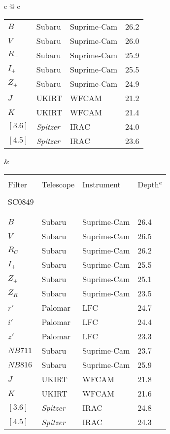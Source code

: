 \documentclass[a4paper,fleqn,usenatbib]{mnras}
\begin{document}
\begin{table*}
\begin{center}
\begin{tabular}{c @{\hskip 15mm} c}
\begin{tabular}{llll}
		$B$    &   Subaru   &   Suprime-Cam   &   26.2   \\
		$V$    &   Subaru   &   Suprime-Cam   &   26.0   \\
		$R_+$    &   Subaru   &   Suprime-Cam   &   25.9   \\
		$I_+$    &   Subaru   &   Suprime-Cam   &   25.5   \\
		$Z_+$    &   Subaru   &   Suprime-Cam   &   24.9   \\
		$J$   &   UKIRT   &   WFCAM   &   21.2   \\
		$K$   &   UKIRT   &   WFCAM   &   21.4   \\
		$[3.6]$  &   {\it Spitzer}  &   IRAC   &   24.0   \\
		$[4.5]$  &   {\it Spitzer}  &   IRAC   &   23.6   \\



		\end{tabular}

		&

		\begin{tabular}{llll}

		\hline \\[-3mm]  

		Filter & Telescope & Instrument & Depth$^a$ \\[0mm]

		\hline \\[-3mm]  
		SC0849 \\[-1mm]
		\hline \\[-5mm]  
		\hline \\[-2mm]

		$B$    &   Subaru   &   Suprime-Cam   &   26.4   \\
		$V$    &   Subaru   &   Suprime-Cam   &   26.5   \\
		$R_C$  &   Subaru   &   Suprime-Cam   &   26.2   \\
		$I_+$  &   Subaru   &   Suprime-Cam   &   25.5   \\
		$Z_+$  &   Subaru   &   Suprime-Cam   &   25.1   \\
		$Z_R$  &   Subaru   &   Suprime-Cam   &   23.5   \\
		$r'$   &   Palomar   &   LFC   &   24.7   \\
		$i'$   &   Palomar   &   LFC   &   24.4   \\
		$z'$   &   Palomar   &   LFC   &   23.3   \\
		$NB711$  &   Subaru   &   Suprime-Cam   &   23.7   \\
		$NB816$  &   Subaru   &   Suprime-Cam   &   25.9   \\
		$J$   &   UKIRT   &   WFCAM   &   21.8   \\
		$K$   &   UKIRT   &   WFCAM   &   21.6   \\
		$[3.6]$  &   {\it Spitzer}  &   IRAC   &   24.8   \\
		$[4.5]$  &   {\it Spitzer}  &   IRAC   &   24.3   \\[1mm]



\end{tabular}
\end{tabular}
\end{center}
\end{table*}
\end{document}
